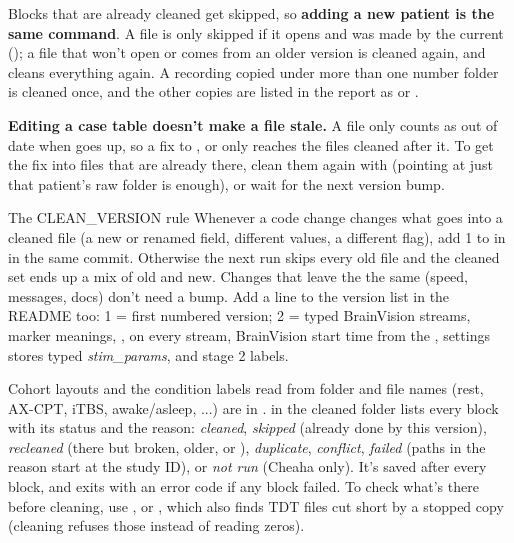 Blocks that are already cleaned get skipped, so \textbf{adding a new patient is the same command}. A file is only skipped if it opens and was made by the current  (); a file that won't open or comes from an older version is cleaned again, and  cleans everything again. A recording copied under more than one number folder is cleaned once, and the other copies are listed in the report as  or .

\textbf{Editing a case table doesn't make a file stale.} A file only counts as out of date when  goes up, so a fix to ,  or  only reaches the files cleaned after it. To get the fix into files that are already there, clean them again with  (pointing at just that patient's raw folder is enough), or wait for the next version bump.

\begin{careful}{The CLEAN\_VERSION rule}
Whenever a code change changes what goes into a cleaned file (a new or renamed field, different values, a different flag), add 1 to  in  in the same commit. Otherwise the next run skips every old file and the cleaned set ends up a mix of old and new. Changes that leave the  the same (speed, messages, docs) don't need a bump. Add a line to the version list in the README too: 1 = first numbered version; 2 = typed BrainVision streams, marker meanings, ,  on every stream, BrainVision start time from the , settings stores typed \textit{stim\_params},  and stage 2 labels.
\end{careful} Cohort layouts and the condition labels read from folder and file names (rest, AX-CPT, iTBS, awake/asleep, ...) are in .  in the cleaned folder lists every block with its status and the reason: \textit{cleaned}, \textit{skipped} (already done by this version), \textit{recleaned} (there but broken, older, or ), \textit{duplicate}, \textit{conflict}, \textit{failed} (paths in the reason start at the study ID), or \textit{not run} (Cheaha only). It's saved after every block, and  exits with an error code if any block failed. To check what's there before cleaning, use , or , which also finds TDT  files cut short by a stopped copy (cleaning refuses those instead of reading zeros).

